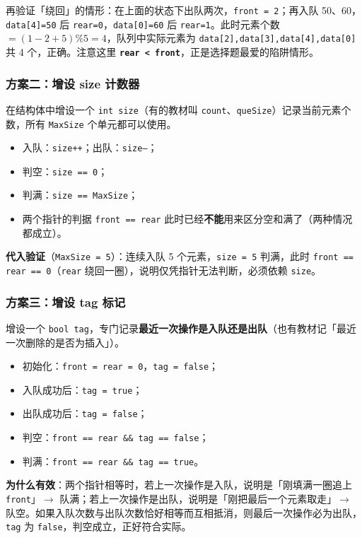 \documentclass[11pt,openany,UTF8]{ctexbook}
\begin{document}
再验证「绕回」的情形：在上面的状态下出队两次，\texttt{front =\allowbreak{} 2}；再入队 50、60，\texttt{data[4]\allowbreak{}=\allowbreak{}50} 后 \texttt{rear=\allowbreak{}0}，\texttt{data[0]\allowbreak{}=\allowbreak{}60} 后 \texttt{rear=\allowbreak{}1}。此时元素个数 $=(1-2+5)\%5=4$，队列中实际元素为 \texttt{data[2]\allowbreak{},\allowbreak{}data[3]\allowbreak{},\allowbreak{}data[4]\allowbreak{},\allowbreak{}data[0]\allowbreak{}} 共 4 个，正确。注意这里 \textbf{\texttt{rear <\allowbreak{} front}}，正是选择题最爱的陷阱情形。

\subsubsection{方案二：增设 size 计数器}

在结构体中增设一个 \texttt{int size}（有的教材叫 \texttt{count}、\texttt{queSize}）记录当前元素个数，所有 \texttt{MaxSize} 个单元都可以使用。

\begin{itemize}
\item 入队：\texttt{size+\allowbreak{}+\allowbreak{}}；出队：\texttt{size--}；
\item 判空：\texttt{size =\allowbreak{}=\allowbreak{} 0}；
\item 判满：\texttt{size =\allowbreak{}=\allowbreak{} MaxSize}；
\item 两个指针的判据 \texttt{front =\allowbreak{}=\allowbreak{} rear} 此时已经\textbf{不能}用来区分空和满了（两种情况都成立）。
\end{itemize}
\textbf{代入验证}（\texttt{MaxSize =\allowbreak{} 5}）：连续入队 5 个元素，\texttt{size =\allowbreak{} 5} 判满，此时 \texttt{front =\allowbreak{}=\allowbreak{} rear =\allowbreak{}=\allowbreak{} 0}（\texttt{rear} 绕回一圈），说明仅凭指针无法判断，必须依赖 \texttt{size}。

\subsubsection{方案三：增设 tag 标记}

增设一个 \texttt{bool tag}，专门记录\textbf{最近一次操作是入队还是出队}（也有教材记「最近一次删除的是否为插入」）。

\begin{itemize}
\item 初始化：\texttt{front =\allowbreak{} rear =\allowbreak{} 0}，\texttt{tag =\allowbreak{} false}；
\item 入队成功后：\texttt{tag =\allowbreak{} true}；
\item 出队成功后：\texttt{tag =\allowbreak{} false}；
\item 判空：\texttt{front =\allowbreak{}=\allowbreak{} rear \&\& tag =\allowbreak{}=\allowbreak{} false}；
\item 判满：\texttt{front =\allowbreak{}=\allowbreak{} rear \&\& tag =\allowbreak{}=\allowbreak{} true}。
\end{itemize}
\textbf{为什么有效}：两个指针相等时，若上一次操作是入队，说明是「刚填满一圈追上 \texttt{front}」$\to$ 队满；若上一次操作是出队，说明是「刚把最后一个元素取走」$\to$ 队空。如果入队次数与出队次数恰好相等而互相抵消，则最后一次操作必为出队，\texttt{tag} 为 \texttt{false}，判空成立，正好符合实际。
\end{document}
